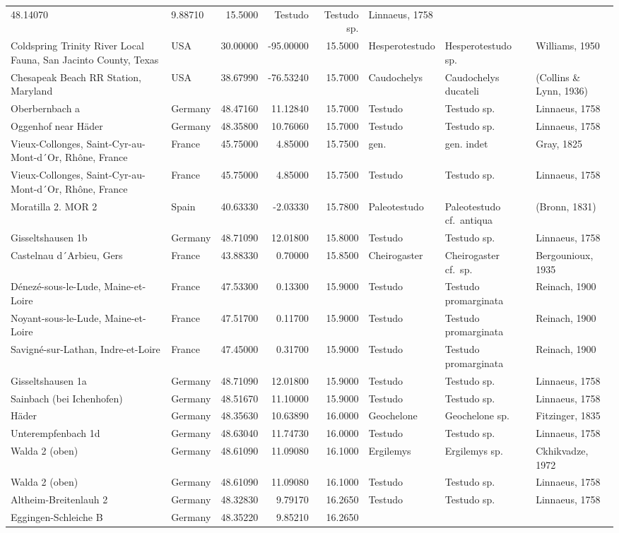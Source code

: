 \documentclass[]{article}
\begin{document}
\begin{longtable}[]{@{}llrrrlll@{}}
48.14070 & 9.88710 & 15.5000 & Testudo & Testudo sp. & Linnaeus,
1758\tabularnewline
Coldspring Trinity River Local Fauna, San Jacinto County, Texas & USA &
30.00000 & -95.00000 & 15.5000 & Hesperotestudo & Hesperotestudo sp. &
Williams, 1950\tabularnewline
Chesapeak Beach RR Station, Maryland & USA & 38.67990 & -76.53240 &
15.7000 & Caudochelys & Caudochelys ducateli & (Collins \& Lynn,
1936)\tabularnewline
Oberbernbach a & Germany & 48.47160 & 11.12840 & 15.7000 & Testudo &
Testudo sp. & Linnaeus, 1758\tabularnewline
Oggenhof near Häder & Germany & 48.35800 & 10.76060 & 15.7000 & Testudo
& Testudo sp. & Linnaeus, 1758\tabularnewline
Vieux-Collonges, Saint-Cyr-au-Mont-d´Or, Rhône, France & France &
45.75000 & 4.85000 & 15.7500 & gen. & gen. indet & Gray,
1825\tabularnewline
Vieux-Collonges, Saint-Cyr-au-Mont-d´Or, Rhône, France & France &
45.75000 & 4.85000 & 15.7500 & Testudo & Testudo sp. & Linnaeus,
1758\tabularnewline
Moratilla 2. MOR 2 & Spain & 40.63330 & -2.03330 & 15.7800 &
Paleotestudo & Paleotestudo cf.~antiqua & (Bronn, 1831)\tabularnewline
Gisseltshausen 1b & Germany & 48.71090 & 12.01800 & 15.8000 & Testudo &
Testudo sp. & Linnaeus, 1758\tabularnewline
Castelnau d´Arbieu, Gers & France & 43.88330 & 0.70000 & 15.8500 &
Cheirogaster & Cheirogaster cf.~sp. & Bergounioux, 1935\tabularnewline
Dénezé-sous-le-Lude, Maine-et-Loire & France & 47.53300 & 0.13300 &
15.9000 & Testudo & Testudo promarginata & Reinach, 1900\tabularnewline
Noyant-sous-le-Lude, Maine-et-Loire & France & 47.51700 & 0.11700 &
15.9000 & Testudo & Testudo promarginata & Reinach, 1900\tabularnewline
Savigné-sur-Lathan, Indre-et-Loire & France & 47.45000 & 0.31700 &
15.9000 & Testudo & Testudo promarginata & Reinach, 1900\tabularnewline
Gisseltshausen 1a & Germany & 48.71090 & 12.01800 & 15.9000 & Testudo &
Testudo sp. & Linnaeus, 1758\tabularnewline
Sainbach (bei Ichenhofen) & Germany & 48.51670 & 11.10000 & 15.9000 &
Testudo & Testudo sp. & Linnaeus, 1758\tabularnewline
Häder & Germany & 48.35630 & 10.63890 & 16.0000 & Geochelone &
Geochelone sp. & Fitzinger, 1835\tabularnewline
Unterempfenbach 1d & Germany & 48.63040 & 11.74730 & 16.0000 & Testudo &
Testudo sp. & Linnaeus, 1758\tabularnewline
Walda 2 (oben) & Germany & 48.61090 & 11.09080 & 16.1000 & Ergilemys &
Ergilemys sp. & Ckhikvadze, 1972\tabularnewline
Walda 2 (oben) & Germany & 48.61090 & 11.09080 & 16.1000 & Testudo &
Testudo sp. & Linnaeus, 1758\tabularnewline
Altheim-Breitenlauh 2 & Germany & 48.32830 & 9.79170 & 16.2650 & Testudo
& Testudo sp. & Linnaeus, 1758\tabularnewline
Eggingen-Schleiche B & Germany & 48.35220 & 9.85210 & 16.2650 &

\end{longtable}
\end{document}
